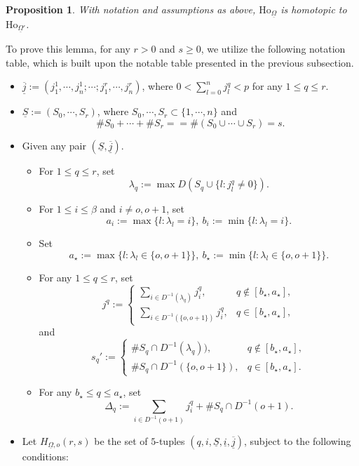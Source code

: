 \documentclass[12pt, a4paper]{article}
\newtheorem{proposition}{Proposition}[section]
\begin{document}
\begin{proposition}\label{Ho^2}
With notation and assumptions as above, $\mathrm{Ho}_{\underline\Omega}$ is homotopic to $\mathrm{Ho}_{\underline\Omega'}$.
\end{proposition}
To prove this lemma, for any $r>0$ and 
$s\geq0$, we utilize the following notation table, which is built upon the notable table presented in the previous subsection.
\begin{itemize}
    \item $\underline{\overline j}:=(j^1_1,\cdots,j^1_n;\cdots;j^r_1,\cdots,j^r_n)$, where $0<\sum_{l=0}^nj^q_l<p$ for any $1\leq q\leq r$.
    \item $\underline{S}:=(S_0,\cdots,S_r)$, where $S_0,\cdots,S_r\subset\{1,\cdots,n\}$ and 
    $$\#S_0+\cdots+\#S_r==\#(S_0\cup\cdots\cup S_r)=s.$$
    \item Given any pair $(\underline S,\underline{\overline j})$.
    \begin{itemize}
    
        \item For $1\leq q\leq r$, set 
        $$\lambda_q:=\max D(S_q\cup\{l: j^q_l\neq0\}).$$
        
        \item  For $1\leq i\leq \beta$ and $i\neq o,o+1$, set
$$
   a_i:=\max\{l:\lambda_l=i\},~b_i:=\min\{l:\lambda_l=i\}.
   $$ 
        \item Set
   $$
   a_\star:=\max\{l:\lambda_l\in \{o,o+1\}\},~b_\star:=\min\{l:\lambda_l\in \{o,o+1\}\}.
   $$
   
   \item  For any $1\leq q\leq r$, set
   $$
   j^q:=\left\{
  \begin{matrix}
      \sum_{i\in D^{-1}(\lambda_q)}j^q_i,&q\notin [b_\star,a_\star],\\
      \sum_{i\in D^{-1}(\{o,o+1\})}j^q_i,&q\in[b_\star,a_\star],
  \end{matrix}
  \right.   
  $$
  and
  $$
  s_q':=\left\{
  \begin{matrix}
\#S_q\cap D^{-1}(\lambda_q)),&q\notin [b_\star,a_\star],\\
\#S_q\cap D^{-1}(\{o,o+1\}),&q\in [b_\star,a_\star].
\end{matrix}
  \right.
  $$
\item   For any $b_\star\leq q\leq a_\star$, set
  $$
  \Delta_q:=\sum_{i\in D^{-1}(o+1)}j^q_i+\#S_q\cap D^{-1}(o+1).
  $$
    \end{itemize} 
    \item Let $H_{\underline\Omega,o}(r,s)$ be the set of $5$-tuples $(q,i,\underline{S},\underline i,\underline{\overline j})$, subject to the following conditions:
    \begin{itemize}


\end{itemize}
\end{itemize}
\end{document}

